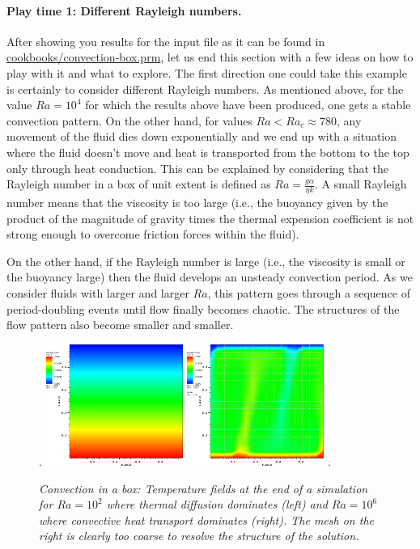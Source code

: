 \documentclass{article}
\begin{document}
\paragraph{Play time 1: Different Rayleigh numbers.} After showing you results
for the input file as it can be found in \url{cookbooks/convection-box.prm}, let us
end this section with a few ideas on how to play with it and what to explore.
The first direction one could take this example is certainly to consider
different Rayleigh numbers. As mentioned above, for the value $Ra=10^4$ for
which the results above have been produced, one gets a stable convection
pattern. On the other hand, for values $Ra<Ra_c\approx 780$, any movement of
the fluid dies down exponentially and we end up with a situation where the fluid
doesn't move and heat is transported from the bottom to the top only through
heat conduction. This can be explained by considering that the Rayleigh number
in a box of unit extent is defined as $Ra=\frac{g\alpha}{\eta k}$. A small
Rayleigh number means that the viscosity is too large (i.e., the buoyancy given
by the product of the magnitude of gravity times the thermal expension
coefficient is not strong enough to overcome friction forces within the fluid).

On the other hand, if the Rayleigh number is large (i.e., the viscosity is
small or the buoyancy large) then the fluid develops an unsteady convection
period. As we consider fluids with larger and larger $Ra$, this pattern goes
through a sequence of period-doubling events until flow finally becomes chaotic.
The structures of the flow pattern also become smaller and smaller.

\begin{figure}
\phantom.
\hfill
\includegraphics[width=0.4\textwidth]{cookbooks/convection-box/ra_1e2_visit0000}
\hfill
\includegraphics[width=0.4\textwidth]{cookbooks/convection-box/ra_1e6_visit0001}
\hfill
\phantom.
\caption{\it Convection in a box: Temperature fields at the end of a
simulation for $Ra=10^2$ where thermal diffusion dominates (left) and $Ra=10^6$
where convective heat transport dominates (right).
The mesh on the right is clearly too coarse to resolve the structure of the solution.}
\label{fig:convection-box-fields-different-Ra}
\end{figure}
\end{document}
